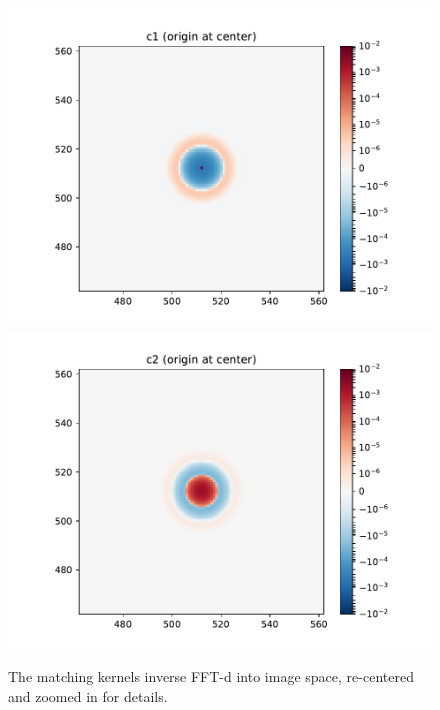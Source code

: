 \begin{figure}
\begin{center}
  \includegraphics[width=4.5in]{fig/fft_steps_direct_c1_zoomed.pdf}
  \includegraphics[width=4.5in]{fig/fft_steps_direct_c2_zoomed.pdf}
\end{center}
\caption{\label{fig:fft_steps_direct_c1c2}The matching kernels inverse
  FFT-d into image space, re-centered and zoomed in for
  details.}
\end{figure}
%
